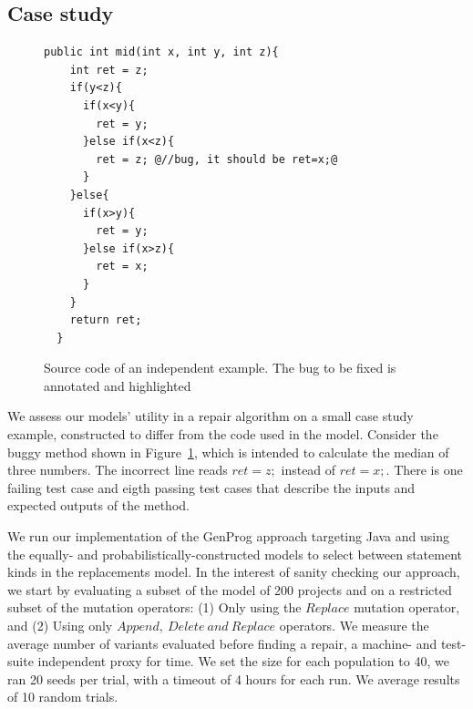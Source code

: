 \documentclass[conference]{IEEEtran}
\begin{document}
\subsection{Case study}
\label{sec:casestudy}


\begin{figure}[t]
\begin{lstlisting}[frame=single,style=base]
  public int mid(int x, int y, int z){
    int ret = z;  
    if(y<z){
      if(x<y){
        ret = y;
      }else if(x<z){
        ret = z; @//bug, it should be ret=x;@
      }
    }else{
      if(x>y){
        ret = y;
      }else if(x>z){
        ret = x;
      }
    }
    return ret;
  }	
	\end{lstlisting}
	\caption{Source code of an independent example. The bug to be fixed is annotated and highlighted}
	\label{fig:initialExample}
\end{figure}

We assess our
models' utility in a repair algorithm on a small case study example, constructed
to differ from the code used in the model.  Consider the buggy method shown in
Figure~\ref{fig:initialExample}, which is intended to  calculate the median 
of three numbers.  The incorrect line reads 
$ret = z;$ instead of $ret = x;$. There is one failing test case and eigth passing test cases that describe the inputs and expected outputs of the method.

We run our implementation of the GenProg approach targeting Java and using the
equally- and probabilistically-constructed models to select between statement kinds in the replacements model. In the interest of sanity checking our approach, we 
start by evaluating a subset of the model of 200 projects and on a restricted subset of 
the mutation operators: (1) Only using the $Replace$ mutation operator, and (2) Using only $Append,~
Delete~and~Replace$ operators.  We measure the average number of variants
evaluated before finding a repair, a machine- and test-suite independent proxy
for time. We set the size for each population to 40, we ran 20
seeds per trial, with a timeout of 4 hours for each run.  We average results of 10 random trials.
\end{document}
